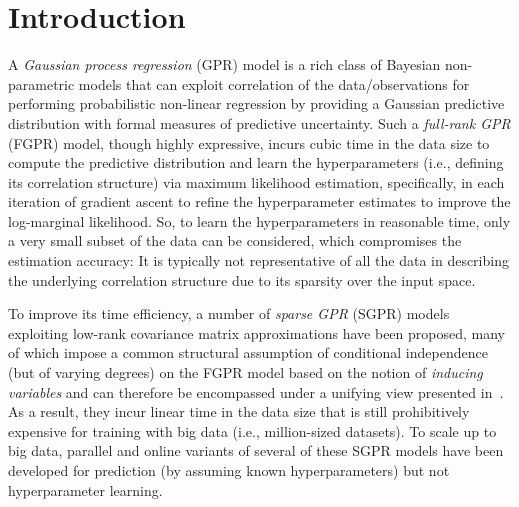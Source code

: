 \documentclass[conference]{IEEEtran}
\begin{document}

\section{Introduction}
\label{sect:intro}
A \emph{Gaussian process regression} (GPR) model is a rich class of Bayesian non-parametric models that can exploit correlation of the data/observations for performing probabilistic non-linear regression by providing a Gaussian predictive distribution with formal measures of predictive uncertainty.
	Such a \emph{full-rank GPR} (FGPR) model, though highly expressive, incurs cubic time in the data size to compute the predictive distribution and 
	learn the hyperparameters (i.e., defining its correlation structure) via maximum likelihood estimation, 
specifically, in each iteration of gradient ascent to refine the  hyperparameter estimates to improve the log-marginal likelihood.
	So, to learn the hyperparameters in reasonable time, only a very small subset of the data can be considered, which compromises the estimation accuracy:
	It is typically not representative of all the data in describing the underlying correlation structure due to its sparsity over the input space. 
	
	To improve its time efficiency, a number of \emph{sparse GPR} (SGPR) models exploiting low-rank covariance matrix approximations \cite{candela10,candela05} have been proposed,
	many of which impose a common structural assumption of conditional independence (but of varying degrees) on the FGPR model based on the notion of \emph{inducing variables} and can therefore be encompassed under a unifying view presented in~\cite{candela05}.
	As a result, they incur linear time in the data size that is still prohibitively expensive for training with big data (i.e., million-sized datasets).
	To scale up to big data, parallel \cite{LowUAI13,LowAAAI15,LowDyDESS15} and online \cite{Csato02,LowAAAI14} variants of several of these SGPR models have been developed for prediction (by assuming known hyperparameters) but not hyperparameter learning.
	
\end{document}
